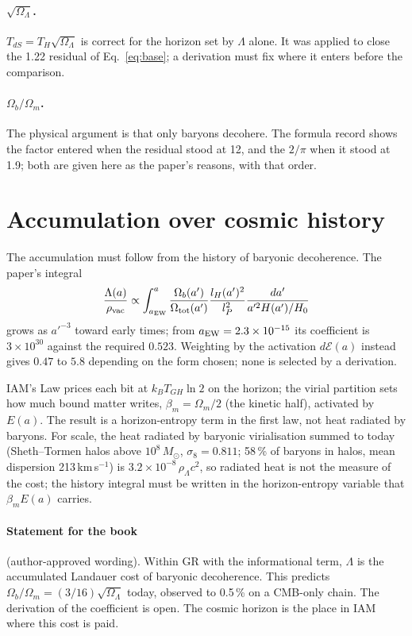 \paragraph{$\sqrt{\Omega_\Lambda}$.} $T_{dS}=T_H\sqrt{\Omega_\Lambda}$ is correct for the horizon set by $\Lambda$ alone. It was applied to
close the 1.22 residual of Eq.~\eqref{eq:base}; a derivation must fix where it enters before the comparison.
\paragraph{$\Omega_b/\Omega_m$.} The physical argument is that only baryons decohere. The formula record shows the factor entered when the
residual stood at 12, and the $2/\pi$ when it stood at 1.9; both are given here as the paper's reasons, with that order.

\section{Accumulation over cosmic history}
The accumulation must follow from the history of baryonic decoherence. The paper's integral
\begin{equation}\frac{\Lambda(a)}{\rho_{\rm vac}}\propto\int_{a_{\rm EW}}^{a}\frac{\Omega_b(a')}{\Omega_{\rm tot}(a')}
\frac{l_H(a')^2}{l_P^2}\frac{da'}{a'^2H(a')/H_0}\end{equation}
grows as $a'^{-3}$ toward early times; from $a_{\rm EW}=2.3\times10^{-15}$ its coefficient is $3\times10^{30}$ against the required $0.523$.
Weighting by the activation $d\mathcal E(a)$ instead gives $0.47$ to $5.8$ depending on the form chosen; none is selected by a derivation.

IAM's Law prices each bit at $k_BT_{GH}\ln2$ on the horizon; the virial partition sets how much bound matter writes, $\beta_m=\Omega_m/2$ (the
kinetic half), activated by $E(a)$. The result is a horizon-entropy term in the first law, not heat radiated by baryons. For scale, the heat radiated by baryonic virialisation
summed to today (Sheth--Tormen halos above $10^8\,M_\odot$, $\sigma_8=0.811$; 58\,\% of baryons in halos, mean dispersion 213\,km\,s$^{-1}$) is
$3.2\times10^{-8}\,\rho_\Lambda c^2$, so radiated heat is not the measure of the cost; the history integral must be written in the horizon-entropy
variable that $\beta_mE(a)$ carries.

\paragraph{Statement for the book} (author-approved wording). Within GR with the informational term, $\Lambda$ is the accumulated Landauer cost
of baryonic decoherence. This predicts $\Omega_b/\Omega_m=(3/16)\sqrt{\Omega_\Lambda}$ today, observed to 0.5\,\% on a CMB-only chain. The
derivation of the coefficient is open. The cosmic horizon is the place in IAM where this cost is paid.

